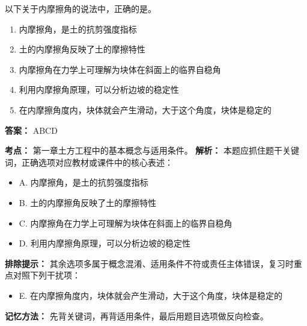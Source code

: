 \documentclass[UTF8,fontset=fandol,11pt]{ctexart}
\begin{document}
\begin{quizbox}[title={第 9 题}]
以下关于内摩擦角的说法中，正确的是。\\
\begin{enumerate}[label=\Alph*.]
\item 内摩擦角，是土的抗剪强度指标
\item 土的内摩擦角反映了土的摩擦特性
\item 内摩擦角在力学上可理解为块体在斜面上的临界自稳角
\item 利用内摩擦角原理，可以分析边坡的稳定性
\item 在内摩擦角度内，块体就会产生滑动，大于这个角度，块体是稳定的
\end{enumerate}
\textbf{答案：} ABCD
\vspace{0.25em}
\begin{answerbox}[title={考点解析}]
\textbf{考点：} 第一章土方工程中的基本概念与适用条件。
\textbf{解析：} 本题应抓住题干关键词，正确选项对应教材或课件中的核心表述：
\begin{itemize}
\item A. 内摩擦角，是土的抗剪强度指标
\item B. 土的内摩擦角反映了土的摩擦特性
\item C. 内摩擦角在力学上可理解为块体在斜面上的临界自稳角
\item D. 利用内摩擦角原理，可以分析边坡的稳定性
\end{itemize}
\textbf{排除提示：} 其余选项多属于概念混淆、适用条件不符或责任主体错误，复习时重点对照下列干扰项：
\begin{itemize}
\item E. 在内摩擦角度内，块体就会产生滑动，大于这个角度，块体是稳定的
\end{itemize}
\textbf{记忆方法：} 先背关键词，再背适用条件，最后用题目选项做反向检查。
\end{answerbox}
\end{quizbox}
\end{document}
